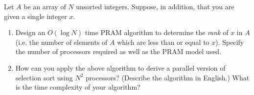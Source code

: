 Let $A$ be an array of $N$ unsorted integers.  Suppose, in addition,
that you are given a single integer $x$.  

\begin{enumerate}

\item

Design an $O(\log  N)$ time PRAM algorithm to determine the {\em rank}
of $x$ in $A$ (i.e. the number of elements of $A$ which are less than
or equal to $x$).  Specify the number of processors required as well as
the PRAM model used.

\item

How can you apply the above algorithm to derive a parallel version of
selection sort using $N^2$ processors? (Describe the algorithm in
English.) What is the time complexity of your algorithm?

\end{enumerate}
